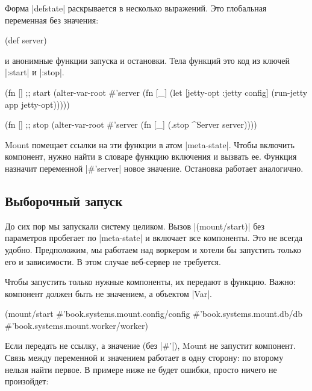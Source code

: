 Форма \spverb|defstate| раскрывается в несколько выражений. Это глобальная
переменная без значения:

\begin{english}
  \begin{clojure}
(def server)
  \end{clojure}
\end{english}

\noindent
и анонимные функции запуска и остановки. Тела функций это код из ключей
\spverb|:start| и \spverb|:stop|.

\begin{english}
  \begin{clojure}
(fn [] ;; start
  (alter-var-root #'server
   (fn [_]
     (let [{jetty-opt :jetty} config]
       (run-jetty app jetty-opt)))))

(fn [] ;; stop
  (alter-var-root #'server
   (fn [_]
     (.stop ^Server server))))
  \end{clojure}
\end{english}

Mount помещает ссылки на эти функции в атом \spverb|meta-state|. Чтобы включить
компонент, нужно найти в словаре функцию включения и вызвать ее. Функция
назначит переменной \spverb|#'server| новое значение. Остановка работает
аналогично.

\subsection{Выборочный запуск}

До сих пор мы запускали систему целиком. Вызов \spverb|(mount/start)| без
параметров пробегает по \spverb|meta-state| и включает все компоненты. Это не
всегда удобно. Предположим, мы работаем над воркером и хотели бы запустить
только его и зависимости. В этом случае веб-сервер не требуется.

Чтобы запустить только нужные компоненты, их передают в функцию. Важно:
компонент должен быть не значением, а объектом \spverb|Var|.

\begin{english}
  \begin{clojure}
(mount/start
  #'book.systems.mount.config/config
  #'book.systems.mount.db/db
  #'book.systems.mount.worker/worker)
  \end{clojure}
\end{english}

Если передать не ссылку, а значение (без \spverb|#'|), Mount не запустит
компонент. Связь между переменной и значением работает в одну сторону: по
второму нельзя найти первое. В примере ниже не будет ошибки, просто ничего не
произойдет:

